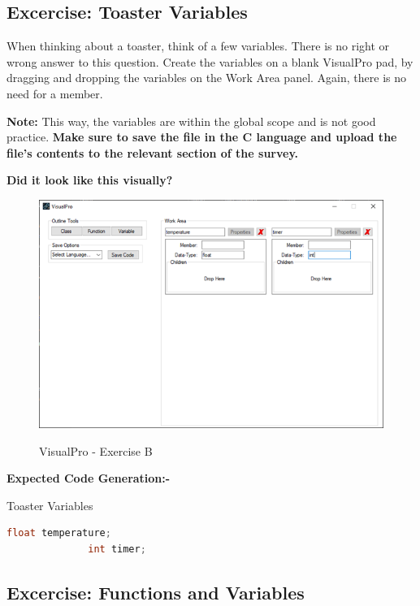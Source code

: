 \documentclass[10pt]{article}
\begin{document}
    \subsection{Excercise: Toaster Variables}
        When thinking about a toaster, think of a few variables. There is no right or wrong answer to this question. Create the variables on a blank VisualPro pad, by dragging and dropping the variables on the Work Area panel. Again, there is no need for a member.

        \textbf{Note:} This way, the variables are within the global scope and is not good practice. \textbf{Make sure to save the file in the C language and upload the file's contents to the relevant section of the survey.}

        \textbf{Did it look like this visually?}
          \begin{figure}[h]
            \centering
            {\includegraphics[scale=0.75]{Figures/Exercises/TutB-SecB-1.png}}
            \caption{VisualPro - Exercise B}
            \label{fig:vp-eB}
          \end{figure}

        \textbf{Expected Code Generation:-}\\
          \begin{example}{Toaster Variables}
            \begin{lstlisting}[language=c]
              float temperature;
              int timer;
            \end{lstlisting}
          \end{example}
    \subsection{Excercise: Functions and Variables}
\end{document}
